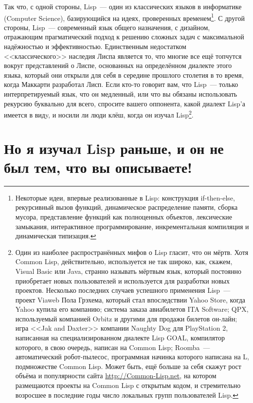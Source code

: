 Так что, с одной стороны, Lisp~--- один из классических языков в информатике (Computer
Science), базирующийся на идеях, проверенных временем\footnote{Некоторые идеи, впервые
  реализованные в Lisp: конструкция if-then-else, рекурсивный вызов функций, динамическое
  распределение памяти, сборка мусора, представление функций как полноценных объектов,
  лексические замыкания, интерактивное программирование, инкрементальная компиляция и
  динамическая типизация.}. С другой стороны, Lisp~--- современный язык общего назначения,
с дизайном, отражающим прагматический подход к решению сложных задач с максимальной
надёжностью и эффективностью. Единственным недостатком <<классического>> наследия Лиспа
является то, что многие все ещё топчутся вокруг представлений о Лиспе, основанных на
определённом диалекте этого языка, который они открыли для себя в середине прошлого
столетия в то время, когда Маккарти разработал Лисп. Если кто-то говорит вам, что Lisp~---
только интерпретируемый язык, что он медленный, или что вы обязаны использовать рекурсию
буквально для всего, спросите вашего оппонента, какой диалект Lisp'а имеется в видy, и
носили ли люди клёш, когда он изучал Lisp\footnote{Один из наиболее распространённых мифов
  о Lisp гласит, что он мёртв. Хотя Common Lisp, действительно, используется не так
  широко, как, скажем, Visual Basic или Java, странно называть мёртвым язык, который
  постоянно приобретает новых пользователей и используется для разработки новых
  проектов. Несколько последних случаев успешного применения Lisp~--- проект Viaweb Пола
  Грэхема, который стал впоследствии Yahoo Store, когда Yahoo купила его компанию; система
  заказа авиабилетов ITA Software; QPX, используемый компанией Orbitz и другими для
  продажи билетов он-лайн; игра <<Jak and Daxter>> компании Naughty Dog для PlayStation 2,
  написанная на специализированном диалекте Lisp GOAL, компилятор которого, в свою
  очередь, написан на Common Lisp; Roomba~--- автоматический робот-пылесос, программная
  начинка которого написана на L, подмножестве Common Lisp. Может быть, ещё больше за себя
  скажут рост объёма и популярности сайта \url{http://Common-Lisp.net}, на котором
  размещаются проекты на Common Lisp с открытым кодом, и стремительно возросшее в
  последние годы число локальных групп пользователей Lisp.}.

\section{Но я изучал Lisp раньше, и он не был тем, что вы описываете!}

